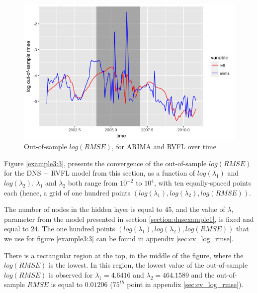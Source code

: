 \begin{figure}[!htb]
\centering
  \includegraphics[width=14cm]{gfx/chapter-rvfl-mts/log_oos_rmse_rvfl_arima}
\caption{Out-of-sample $log(RMSE)$, for ARIMA and RVFL over time}
\label{example3:2}       %
\end{figure}

\medskip

Figure \ref{example3:3}, presents the convergence of the out-of-sample $log(RMSE)$ for the DNS + RVFL model from this section, as a function of $log(\lambda_1)$ and $log(\lambda_2)$. $\lambda_1$ and $\lambda_2$ both range from $10^{-2}$ to $10^{4}$, with ten equally-spaced points each (hence, a grid of one hundred points $\left( log(\lambda_1), log(\lambda_2), log(RMSE)\right)$. 

\medskip

The number of nodes in the hidden layer is equal to $45$, and the value of $\lambda$, parameter from the \cite{nelson1987parsimonious} model presented in section \ref{section:dnsexample1}, is fixed and equal to $24$. The one hundred points $\left( log(\lambda_1), log(\lambda_2), log(RMSE)\right)$ that we use for figure \ref{example3:3} can be found in appendix \ref{sec:cv_log_rmse}. 

\medskip

There is a rectangular region at the top, in the middle of the figure, where the $log(RMSE)$ is the lowest. In this region, the lowest value of the out-of-sample $log(RMSE)$ is observed for $\lambda_1 = 4.6416$ and $\lambda_2 = 464.1589$ and the out-of-sample $RMSE$ is equal to $0.01206$ ($75^{th}$ point in appendix \ref{sec:cv_log_rmse}).   

